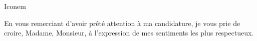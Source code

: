 \documentclass[12pt]{lettre}
\begin{document}
\begin{letter}{Iconem}





    
    \closing{En vous remerciant d’avoir prêté attention à ma candidature, je vous prie de croire, Madame, Monsieur, à l’expression de mes sentiments les plus respectueux.}
    
 
\end{letter}
 
\end{document}
